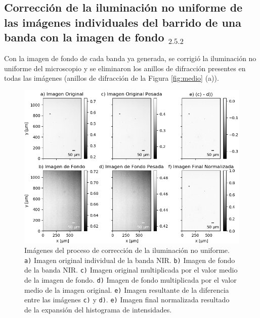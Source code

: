 	
\singlespacing
\subsection{Corrección de la iluminación no uniforme de las imágenes individuales del barrido de una banda con la imagen de fondo \href{https://github.com/jrr1984/defects_analysis/blob/master/bg_normalization.py}{\faGithub$_{2.5.2}$}}
\label{subs:nm}

\hspace{0.5cm} Con la imagen de fondo de cada banda ya generada, se corrigió la iluminación no uniforme del microscopio \cite{Nordenfelt} y se eliminaron los anillos de difracción presentes en todas las imágenes (anillos de difracción de la Figura \ref{fig:medio} (a)).
\begin{figure}[H]
	\centering
\includegraphics[scale=0.98]{Figs/defectosZEISS/correccionilum/NIR/1.png}
\caption{Imágenes del proceso de corrección de la iluminación no uniforme. \texttt{a)} Imagen original individual de la banda NIR. \texttt{b)} Imagen de fondo de la banda NIR. \texttt{c)} Imagen original multiplicada por el valor medio de la imagen de fondo. \texttt{d)} Imagen de fondo multiplicada por el valor medio de la imagen original. \texttt{e)} Imagen resultante de la diferencia entre las imágenes \texttt{c)} y \texttt{d)}. \texttt{e)} Imagen final normalizada resultado de la expansión del histograma de intensidades.}
\label{fig:correcilumims}
\end{figure}

